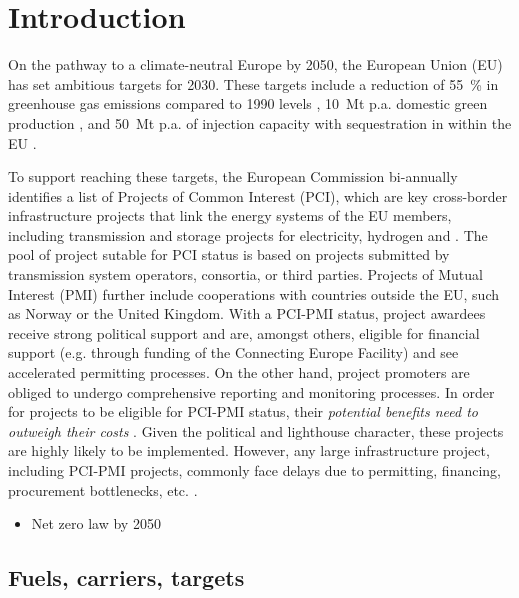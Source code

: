 \documentclass[preprint,12pt,sort&compress]{elsarticle}
\begin{document}
\section{Introduction}
\label{sec:introduction}
On the pathway to a climate-neutral Europe by 2050, the European Union (EU) has set ambitious targets for 2030. These targets include a reduction of \SI{55}{\percent} in greenhouse gas emissions compared to 1990 levels \cite{europeancommissionFit55Delivering2021}, \SI{10}{Mt} p.a. domestic green  production \cite{europeancommissionREPowerEUPlanCommunication2022}, and \SI{50}{Mt} p.a. of  injection capacity with sequestration in within the EU \cite{europeanparliamentRegulationEU20242024}.

To support reaching these targets, the European Commission bi-annually identifies a list of Projects of Common Interest (PCI), which are key cross-border infrastructure projects that link the energy systems of the EU members, including transmission and storage projects for electricity, hydrogen and  \cite{europeancommissionCommissionDelegatedRegulation2023}. 
The pool of project sutable for PCI status is based on projects submitted by transmission system operators, consortia, or third parties. Projects of Mutual Interest (PMI) further include cooperations with countries outside the EU, such as Norway or the United Kingdom. With a PCI-PMI status, project awardees receive strong political support and are, amongst others, eligible for financial support (e.g. through funding of the Connecting Europe Facility) and see accelerated permitting processes. On the other hand, project promoters are obliged to undergo comprehensive reporting and monitoring processes. 
In order for projects to be eligible for PCI-PMI status, their \textit{potential benefits need to outweigh their costs} \cite{europeancommissionCommissionDelegatedRegulation2023}. Given the political and lighthouse character, these projects are highly likely to be implemented. However, any large infrastructure project, including PCI-PMI projects, commonly face delays due to permitting, financing, procurement bottlenecks, etc. \cite
{acerConsolidatedReportProgress2023}.

\begin{itemize}
  \item Net zero law by 2050 \citet{europeanparliamentRegulationEU20242024}
\end{itemize}

\subsection{Fuels, carriers, targets}
\end{document}
